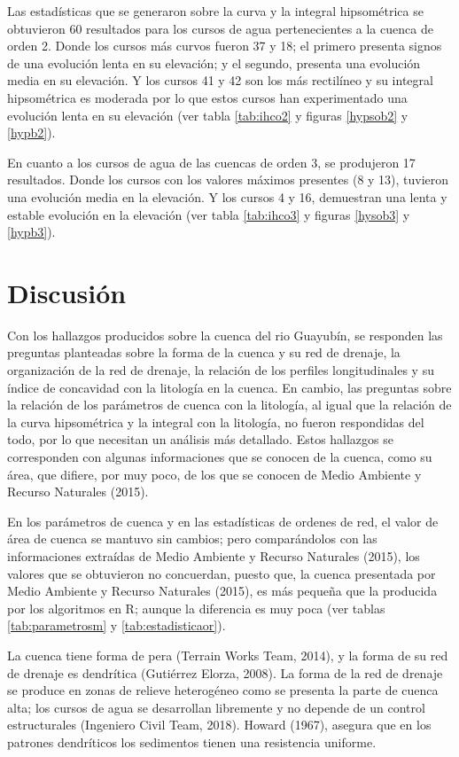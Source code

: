 \documentclass[11pt,]{article}
\begin{document}
Las estadísticas que se generaron sobre la curva y la integral
hipsométrica se obtuvieron 60 resultados para los cursos de agua
pertenecientes a la cuenca de orden 2. Donde los cursos más curvos
fueron 37 y 18; el primero presenta signos de una evolución lenta en su
elevación; y el segundo, presenta una evolución media en su elevación. Y
los cursos 41 y 42 son los más rectilíneo y su integral hipsométrica es
moderada por lo que estos cursos han experimentado una evolución lenta
en su elevación (ver tabla \ref{tab:ihco2} y figuras \ref{hypsob2} y
\ref{hypb2}).

En cuanto a los cursos de agua de las cuencas de orden 3, se produjeron
17 resultados. Donde los cursos con los valores máximos presentes (8 y
13), tuvieron una evolución media en la elevación. Y los cursos 4 y 16,
demuestran una lenta y estable evolución en la elevación (ver tabla
\ref{tab:ihco3} y figuras \ref{hysob3} y \ref{hypb3}).

\section{Discusión}\label{discusiuxf3n}

Con los hallazgos producidos sobre la cuenca del rio Guayubín, se
responden las preguntas planteadas sobre la forma de la cuenca y su red
de drenaje, la organización de la red de drenaje, la relación de los
perfiles longitudinales y su índice de concavidad con la litología en la
cuenca. En cambio, las preguntas sobre la relación de los parámetros de
cuenca con la litología, al igual que la relación de la curva
hipsométrica y la integral con la litología, no fueron respondidas del
todo, por lo que necesitan un análisis más detallado. Estos hallazgos se
corresponden con algunas informaciones que se conocen de la cuenca, como
su área, que difiere, por muy poco, de los que se conocen de Medio
Ambiente y Recurso Naturales (2015).

En los parámetros de cuenca y en las estadísticas de ordenes de red, el
valor de área de cuenca se mantuvo sin cambios; pero comparándolos con
las informaciones extraídas de Medio Ambiente y Recurso Naturales
(2015), los valores que se obtuvieron no concuerdan, puesto que, la
cuenca presentada por Medio Ambiente y Recurso Naturales (2015), es más
pequeña que la producida por los algoritmos en R; aunque la diferencia
es muy poca (ver tablas \ref{tab:parametrosm} y
\ref{tab:estadisticaor}).

La cuenca tiene forma de pera (Terrain Works Team, 2014), y la forma de
su red de drenaje es dendrítica (Gutiérrez Elorza, 2008). La forma de la
red de drenaje se produce en zonas de relieve heterogéneo como se
presenta la parte de cuenca alta; los cursos de agua se desarrollan
libremente y no depende de un control estructurales (Ingeniero Civil
Team, 2018). Howard (1967), asegura que en los patrones dendríticos los
sedimentos tienen una resistencia uniforme.
\end{document}
